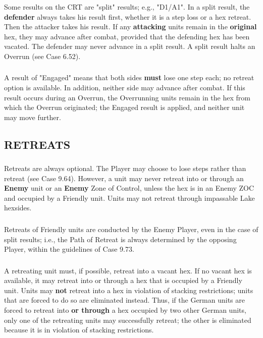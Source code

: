 \subsubsection{} Some results on the CRT are "split" results; e.g., "D1/A1". In a split result, the \textbf{defender} always takes his result first, whether it is a step loss or a hex retreat. Then the attacker takes his result. If any \textbf{attacking} units remain in the \textbf{original} hex, they may advance after combat, provided that the defending hex has been vacated. The defender may never advance in a split result. A split result halts an Overrun (see Case 6.52).

\subsubsection{} A result of "Engaged" means that both sides \textbf{must} lose one step each; no retreat option is available. In addition, neither side may advance after combat. If this result occurs during an Overrun, the Overrunning units remain in the hex from which the Overrun originated; the Engaged result is applied, and neither unit may move further.

\subsection{RETREATS}

\subsubsection{} Retreats are always optional. The Player may choose to lose steps rather than retreat (see Case 9.64). However, a unit may never retreat into or through an \textbf{Enemy} unit or an \textbf{Enemy} Zone of Control, unless the hex is in an Enemy ZOC and occupied by a Friendly unit. Units may not retreat through impassable Lake hexsides.

\subsubsection{} Retreats of Friendly units are conducted by the Enemy Player, even in the case of split results; i.e., the Path of Retreat is always determined by the opposing Player, within the guidelines of Case 9.73.

\subsubsection{} A retreating unit must, if possible, retreat into a vacant hex. If no vacant hex is available, it may retreat into or through a hex that is occupied by a Friendly unit. Units may \textbf{not} retreat into a hex in violation of stacking restrictions; units that are forced to do so are eliminated instead. Thus, if the German units are forced to retreat into \textbf{or through} a hex occupied by two other German units, only one of the retreating units may successfully retreat; the other is eliminated because it is in violation of stacking restrictions.

